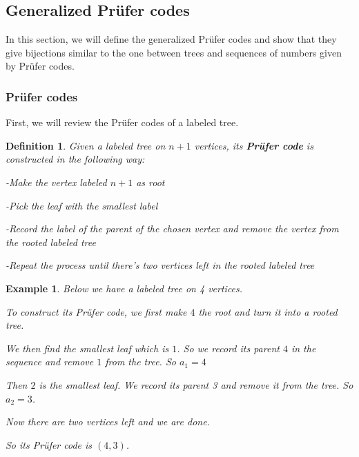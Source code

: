 \documentclass[11pt]{amsart}
\newtheorem{defi}[thm]{Definition}%
\newtheorem{exa}[thm]{Example}%
\begin{document}
\subsection{Generalized Pr\"{u}fer codes}
In this section, we will define the generalized Pr\"{u}fer codes and show that they give bijections similar to the one between trees and sequences of numbers given by Pr\"{u}fer codes.

\subsubsection{Pr\"{u}fer codes}

First, we will review the Pr\"{u}fer codes of a labeled tree.

\begin{defi}
    Given a labeled tree on $n+1$ vertices, its \textbf{Pr\"{u}fer code} is constructed in the following way:

    -Make the vertex labeled $n+1$ as root

    -Pick the leaf with the smallest label

    -Record the label of the parent of the chosen vertex and remove the vertex from the rooted labeled tree

    -Repeat the process until there's two vertices left in the rooted labeled tree
\end{defi}

\begin{exa}
Below we have a labeled tree on 4 vertices.
\begin{center}
\end{center}
To construct its Pr\"{u}fer code, we first make $4$ the root and turn it into a rooted tree.

We then find the smallest leaf which is $1$. So we record its parent $4$ in the sequence and remove $1$ from the tree. So $a_1=4$

Then $2$ is the smallest leaf. We record its parent 3 and remove it from the tree. So $a_2=3$.

Now there are two vertices left and we are done.

So its Pr\"{u}fer code is $(4,3)$.
\end{exa}
\end{document}
